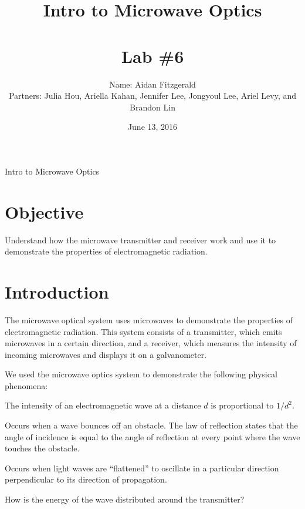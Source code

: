 \documentclass[11pt, titlepage, letterpaper, twoside]{article}
\title{\textbf{Intro to Microwave Optics} \\ \ \\ \large Lab \#6 }
\author{Name: Aidan Fitzgerald \\ Partners: Julia Hou, Ariella Kahan, Jennifer Lee, Jongyoul Lee, Ariel Levy, and Brandon Lin}
\date{June 13, 2016}
\begin{document}
\maketitle

\begin{center}
\LARGE Intro to Microwave Optics
\end{center}

\section*{Objective}

Understand how the microwave transmitter and receiver work and use it to demonstrate the properties of electromagnetic radiation.

\section{Introduction}

The microwave optical system uses microwaves to demonstrate the properties of electromagnetic radiation.
This system consists of a transmitter, which emits microwaves in a certain direction, and a receiver,
which measures the intensity of incoming microwaves and displays it on a galvanometer.

We used the microwave optics system to demonstrate the following physical phenomena:

\begin{description}
  \setlength\itemsep{1em}

  \item [Inverse square law] The intensity of an electromagnetic wave at a distance $d$ is proportional to $1/d^2$.

  \item [Reflection] Occurs when a wave bounces off an obstacle. The law of reflection states that the angle of
  incidence is equal to the angle of reflection at every point where the wave touches the obstacle.

  \item [Polarization] Occurs when light waves are ``flattened'' to oscillate in a particular direction perpendicular
  to its direction of propagation.

  \item [Signal distribution] How is the energy of the wave distributed around the transmitter?

\end{description}
\end{document}
